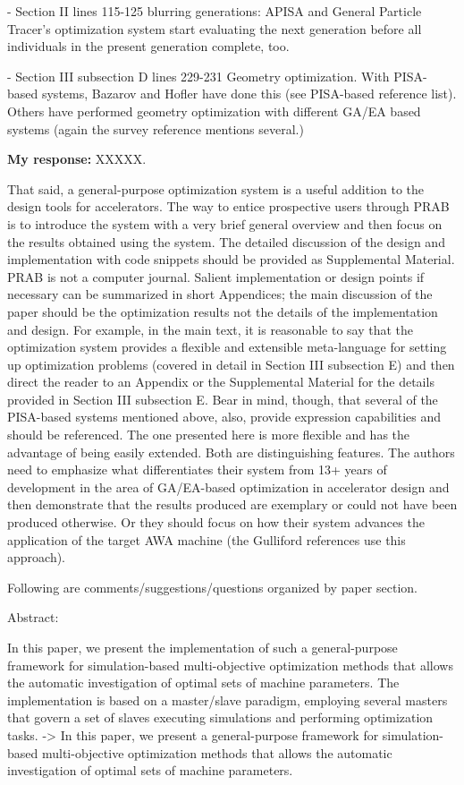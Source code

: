 \documentclass{article}
\begin{document}
- Section II lines 115-125 blurring generations: APISA and General
Particle Tracer’s optimization system start evaluating the next
generation before all individuals in the present generation complete,
too.

- Section III subsection D lines 229-231 Geometry optimization. With
PISA-based systems, Bazarov and Hofler have done this (see PISA-based
reference list). Others have performed geometry optimization with
different GA/EA based systems (again the survey reference mentions
several.)

{\bf My response:} {\color{blue} XXXXX.}

That said, a general-purpose optimization system is a useful addition
to the design tools for accelerators. The way to entice prospective
users through PRAB is to introduce the system with a very brief
general overview and then focus on the results obtained using the
system. The detailed discussion of the design and implementation with
code snippets should be provided as Supplemental Material. PRAB is not
a computer journal. Salient implementation or design points if
necessary can be summarized in short Appendices; the main discussion
of the paper should be the optimization results not the details of the
implementation and design. For example, in the main text, it is
reasonable to say that the optimization system provides a flexible and
extensible meta-language for setting up optimization problems (covered
in detail in Section III subsection E) and then direct the reader to
an Appendix or the Supplemental Material for the details provided in
Section III subsection E. Bear in mind, though, that several of the
PISA-based systems mentioned above, also, provide expression
capabilities and should be referenced. The one presented here is more
flexible and has the advantage of being easily extended. Both are
distinguishing features. The authors need to emphasize what
differentiates their system from 13+ years of development in the area
of GA/EA-based optimization in accelerator design and then demonstrate
that the results produced are exemplary or could not have been
produced otherwise. Or they should focus on how their system advances
the application of the target AWA machine (the Gulliford references
use this approach).

Following are comments/suggestions/questions organized by paper
section.

Abstract:

In this paper, we present the implementation of such a general-purpose
framework for simulation-based multi-objective optimization methods
that allows the automatic investigation of optimal sets of machine
parameters. The implementation is based on a master/slave paradigm,
employing several masters that govern a set of slaves executing
simulations and performing optimization tasks. -> In this paper, we
present a general-purpose framework for simulation-based
multi-objective optimization methods that allows the automatic
investigation of optimal sets of machine parameters.
\end{document}

